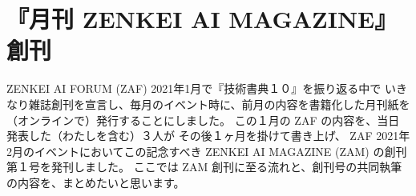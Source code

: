 \documentclass[dvipdfmx,autodetect-engine,10pt,b5paper,papersize,openany,dvipsnames]{jsbook}
\begin{document}
\chapter{『月刊 ZENKEI AI MAGAZINE』創刊}
\label{ch:zam}


ZENKEI AI FORUM (ZAF) 2021年1月で『技術書典１０』を振り返る中で
いきなり雑誌創刊を宣言し、毎月のイベント時に、前月の内容を書籍化した月刊紙を
（オンラインで）発行することにしました。
この１月の ZAF の内容を、当日発表した（わたしを含む）３人が
その後１ヶ月を掛けて書き上げ、
ZAF 2021年2月のイベントにおいてこの記念すべき
ZENKEI AI MAGAZINE (ZAM) の創刊第１号を発刊しました。
ここでは ZAM 創刊に至る流れと、創刊号の共同執筆の内容を、まとめたいと思います。
\end{document}
